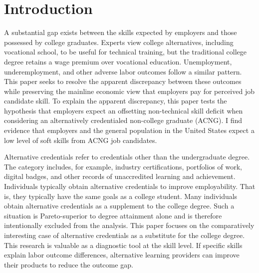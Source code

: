 \documentclass[review]{elsarticle}
\begin{document}
\pagebreak
\linenumbers

\section{Introduction}



A substantial gap exists between the skills expected by employers and those possessed by college graduates\cite{mcgarry2016examination, malik2017great, abbasi2018analysis, gingras2000there}.
Experts view college alternatives,
including vocational school,
to be useful for technical training,
but the traditional college degree retains a wage premium over vocational education.
Unemployment, underemployment, and other adverse labor outcomes follow a similar pattern\cite{smith_2011}.
This paper seeks to resolve the apparent discrepancy between these outcomes while preserving the mainline economic view that employers pay for perceived job candidate skill.
To explain the apparent discrepancy,
this paper tests the hypothesis that employers expect an offsetting non-technical skill deficit when considering an alternatively credentialed non-college graduate (ACNG).
I find evidence that employers and the general population in the United States expect a low level of soft skills from ACNG job candidates.

Alternative credentials refer to credentials other than the undergraduate degree\cite{brown2017complex}.
The category includes, for example,
industry certifications,
portfolios of work,
digital badges, and other records of unaccredited learning and achievement.
Individuals typically obtain alternative credentials to improve employability.
That is, they typically have the same goals as a college student.
Many individuals obtain alternative credentials as a supplement to the college degree.
Such a situation is Pareto-superior to degree attainment alone and is therefore intentionally excluded from the analysis.
This paper focuses on the comparatively interesting case of alternative credentials as a substitute for the college degree.
This research is valuable as a diagnostic tool at the skill level.
If specific skills explain labor outcome differences, alternative learning providers can improve their products to reduce the outcome gap.
\end{document}
